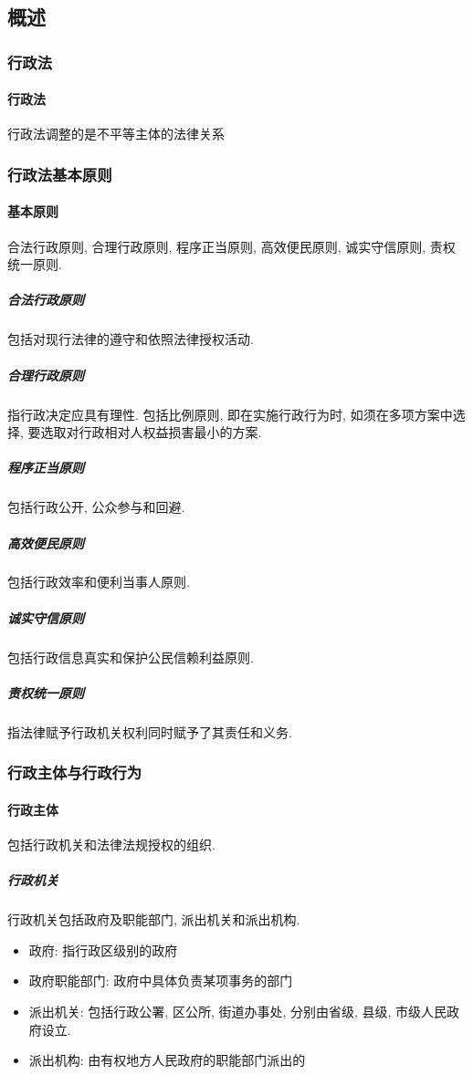 \subsection{概述}

\subsubsection{行政法}

\paragraph{行政法} 行政法调整的是不平等主体的法律关系

\subsubsection{行政法基本原则}

\paragraph{基本原则} 合法行政原则, 合理行政原则, 程序正当原则, 高效便民原则, 诚实守信原则, 责权统一原则.

\subparagraph{合法行政原则} 包括对现行法律的遵守和依照法律授权活动.

\subparagraph{合理行政原则} 指行政决定应具有理性. 包括比例原则, 即在实施行政行为时, 如须在多项方案中选择, 要选取对行政相对人权益损害最小的方案.

\subparagraph{程序正当原则} 包括行政公开, 公众参与和回避.

\subparagraph{高效便民原则} 包括行政效率和便利当事人原则.

\subparagraph{诚实守信原则} 包括行政信息真实和保护公民信赖利益原则.

\subparagraph{责权统一原则} 指法律赋予行政机关权利同时赋予了其责任和义务.

\subsubsection{行政主体与行政行为} 

\paragraph{行政主体} 包括行政机关和法律法规授权的组织.

\subparagraph{行政机关} 行政机关包括政府及职能部门, 派出机关和派出机构. 

\begin{itemize}
    \item 政府: 指行政区级别的政府
    \item 政府职能部门: 政府中具体负责某项事务的部门
    \item 派出机关: 包括行政公署, 区公所, 街道办事处, 分别由省级, 县级, 市级人民政府设立.
    \item 派出机构: 由有权地方人民政府的职能部门派出的
\end{itemize}

